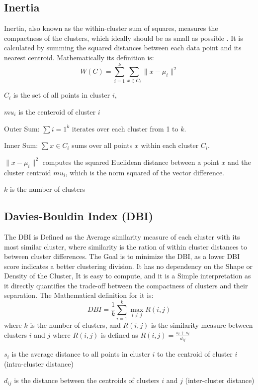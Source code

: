 \subsection{Inertia}\label{subsec:inertia}

Inertia, also known as the within-cluster sum of squares, measures the compactness of the clusters, which ideally should be as small as possible .
It is calculated by summing the squared distances between each data point and its nearest centroid.
Mathematically its definition is:
\[
   W(C) = \sum_{i=1}^k \sum_{x \in C_i} \|x - \mu_i\|^2
\]



$C_i$ is the set of all points in cluster $i$,

$mu_i$ is the centeroid of cluster $i$

Outer Sum: $\sum{i = 1}^k$ iterates over each cluster from 1 to $k$.

Inner Sum: $\sum{x \in C_i}$ sums over all points $x$ within each cluster $C_i$.

$ \|x - \mu_i\|^2$ computes the squared Euclidean distance between a point $x$ and the cluster centroid $mu_i$,
which is the norm squared of the vector difference.

$k$ is the number of clusters

\subsection{Davies-Bouldin Index (DBI)}\label{subsec:davies-bouldin-index-(dbi)}

The DBI is Defined as the Average similarity measure of each cluster with its most similar cluster, where similarity is the ration of within cluster distances
to between cluster differences.
The Goal is to minimize the DBI, as a lower DBI score indicates a better clustering division.
It has no dependency on the Shape or Density of the Cluster, It is easy to compute, and it is a Simple interpretation as it directly
quantifies the trade-off between the compactness of clusters and their separation.
The Mathematical definition for it is:
\[
    DBI = \frac{1}{k} \sum_{i=1}^k \max_{i \neq j} R(i,j)
\]
where $k$ is the number of clusters, and $R(i,j)$ is the similarity measure between clusters $i$ and $j$ where $R(i,j)$
is defined as $R(i,j) = \frac{s_i+s_i}{d_{ij}}$

$s_i$ is the average distance to all points in cluster $i$ to the centroid of cluster $i$ (intra-cluster distance)

$d_{ij}$ is the distance between the centroids of clusters $i$ and $j$ (inter-cluster distance)

